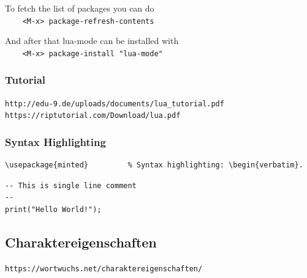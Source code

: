 \documentclass[10pt,a4paper]{article}
\begin{document}
\vskip 4pt
To fetch the list of packages you can do \\
\verb+    <M-x> package-refresh-contents+

\vskip 4pt
And after that lua-mode can be installed with \\
\verb+    <M-x> package-install "lua-mode"+


\subsubsection{Tutorial}

\verb+http://edu-9.de/uploads/documents/lua_tutorial.pdf+ \\
\verb+https://riptutorial.com/Download/lua.pdf+


\subsubsection{Syntax Highlighting}

\begin{verbatim}
\usepackage{minted}         % Syntax highlighting: \begin{verbatim}.
\end{verbatim}

\begin{verbatim}
-- This is single line comment
--
print("Hello World!");
\end{verbatim}


\subsection{Charaktereigenschaften}

\verb+https://wortwuchs.net/charaktereigenschaften/+
\end{document}
